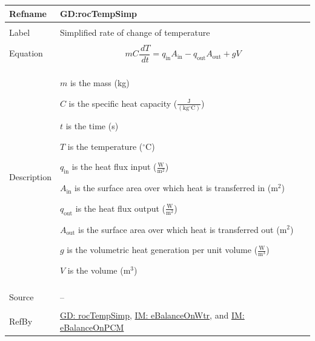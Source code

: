 \documentclass[12pt]{article}
\begin{document}
\vspace{\baselineskip}
\noindent
\begin{minipage}{\textwidth}
\begin{tabular}{>{\raggedright}p{}>{\raggedright\arraybackslash}p{}}
\toprule \textbf{Refname} & \textbf{GD:rocTempSimp}
\label{GD:rocTempSimp}
\\ \midrule \\
Label & Simplified rate of change of temperature
        
\\ \midrule \\
Equation & \begin{displaymath}
           m C \frac{\,dT}{\,dt}={q_{\text{in}}} {A_{\text{in}}}-{q_{\text{out}}} {A_{\text{out}}}+g V
           \end{displaymath}
\\ \midrule \\
Description & \begin{symbDescription}
              \item{$m$ is the mass (kg)}
              \item{$C$ is the specific heat capacity ($\frac{\text{J}}{(\text{kg}{}^{\circ}\text{C})}$)}
              \item{$t$ is the time (s)}
              \item{$T$ is the temperature (${}^{\circ}$C)}
              \item{${q_{\text{in}}}$ is the heat flux input ($\frac{\text{W}}{\text{m}^{2}}$)}
              \item{${A_{\text{in}}}$ is the surface area over which heat is transferred in ($\text{m}^{2}$)}
              \item{${q_{\text{out}}}$ is the heat flux output ($\frac{\text{W}}{\text{m}^{2}}$)}
              \item{${A_{\text{out}}}$ is the surface area over which heat is transferred out ($\text{m}^{2}$)}
              \item{$g$ is the volumetric heat generation per unit volume ($\frac{\text{W}}{\text{m}^{3}}$)}
              \item{$V$ is the volume ($\text{m}^{3}$)}
              \end{symbDescription}
\\ \midrule \\
Source & --
         
\\ \midrule \\
RefBy & \hyperref[GD:rocTempSimp]{GD: rocTempSimp}, \hyperref[IM:eBalanceOnWtr]{IM: eBalanceOnWtr}, and \hyperref[IM:eBalanceOnPCM]{IM: eBalanceOnPCM}
        
\\ \bottomrule
\end{tabular}
\end{minipage}
\end{document}
